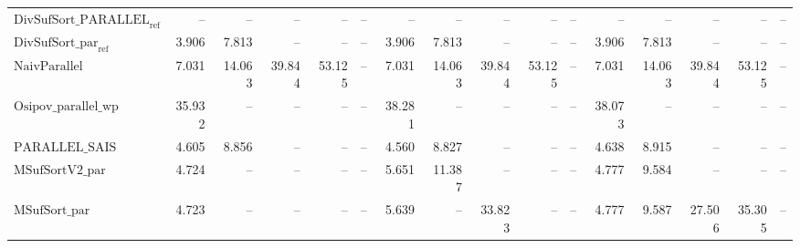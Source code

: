 \begin{table}
{\begin{tabular}{lrrrrrrrrrrrrrrr}
    $\text{DivSufSort\_PARALLEL}_{\text{ref}}$ & {\color{darkgray}--} & {\color{darkgray}--} & {\color{darkgray}--} & {\color{darkgray}--} & {\color{darkgray}--} & {\color{darkgray}--} & {\color{darkgray}--} & {\color{darkgray}--} & {\color{darkgray}--} & {\color{darkgray}--} & {\color{darkgray}--} & {\color{darkgray}--} & {\color{darkgray}--} & {\color{darkgray}--} & {\color{darkgray}--} \\
    $\text{DivSufSort\_par}_{\text{ref}}$ & {\color{green!60!black}3.906} & {\color{green!60!black}7.813} & {\color{darkgray}--} & {\color{darkgray}--} & {\color{darkgray}--} & {\color{green!60!black}3.906} & {\color{green!60!black}7.813} & {\color{darkgray}--} & {\color{darkgray}--} & {\color{darkgray}--} & {\color{green!60!black}3.906} & {\color{green!60!black}7.813} & {\color{darkgray}--} & {\color{darkgray}--} & {\color{darkgray}--} \\
    $\text{NaivParallel}$ & 7.031 & 14.063 & {\color{green!60!black}39.844} & {\color{red}53.125} & {\color{darkgray}--} & 7.031 & 14.063 & {\color{red}39.844} & {\color{red}53.125} & {\color{darkgray}--} & 7.031 & 14.063 & {\color{red}39.844} & {\color{red}53.125} & {\color{darkgray}--} \\
    $\text{Osipov\_parallel\_wp}$ & {\color{red}35.932} & {\color{darkgray}--} & {\color{darkgray}--} & {\color{darkgray}--} & {\color{darkgray}--} & {\color{red}38.281} & {\color{darkgray}--} & {\color{darkgray}--} & {\color{darkgray}--} & {\color{darkgray}--} & {\color{red}38.073} & {\color{darkgray}--} & {\color{darkgray}--} & {\color{darkgray}--} & {\color{darkgray}--} \\
    $\text{PARALLEL\_SAIS}$ & 4.605 & {\color{green!60!black}8.856} & {\color{darkgray}--} & {\color{darkgray}--} & {\color{darkgray}--} & {\color{green!60!black}4.560} & {\color{green!60!black}8.827} & {\color{darkgray}--} & {\color{darkgray}--} & {\color{darkgray}--} & 4.638 & 8.915 & {\color{darkgray}--} & {\color{darkgray}--} & {\color{darkgray}--} \\
    $\text{MSufSortV2\_par}$ & 4.724 & {\color{darkgray}--} & {\color{darkgray}--} & {\color{darkgray}--} & {\color{darkgray}--} & 5.651 & 11.387 & {\color{darkgray}--} & {\color{darkgray}--} & {\color{darkgray}--} & 4.777 & 9.584 & {\color{darkgray}--} & {\color{darkgray}--} & {\color{darkgray}--} \\
    $\text{MSufSort\_par}$ & 4.723 & {\color{darkgray}--} & {\color{darkgray}--} & {\color{darkgray}--} & {\color{darkgray}--} & 5.639 & {\color{darkgray}--} & {\color{red}33.823} & {\color{darkgray}--} & {\color{darkgray}--} & 4.777 & 9.587 & {\color{red}27.506} & {\color{red}35.305} & {\color{darkgray}--} \\

\end{tabular}}
\end{table}
